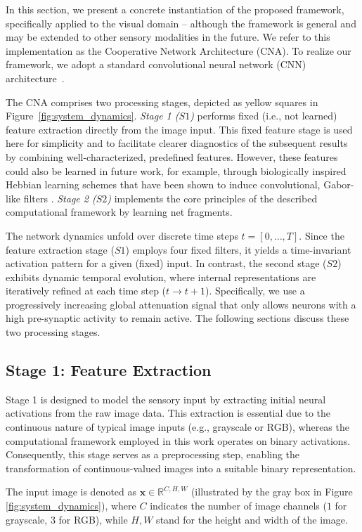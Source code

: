 \documentclass[12pt]{article}
\begin{document}
In this section, we present a concrete instantiation of the proposed framework, specifically applied to the visual domain -- although the framework is general and may be extended to other sensory modalities in the future. We refer to this implementation as the Cooperative Network Architecture (CNA).
To realize our framework, we adopt a standard convolutional neural network (CNN) architecture~\citep{lecun_backpropagation_1989}.

The CNA comprises two processing stages, depicted as yellow squares in Figure~\ref{fig:system_dynamics}. \emph{Stage 1 ($S1$)} performs fixed (i.e., not learned) feature extraction directly from the image input. This fixed feature stage is used here for simplicity and to facilitate clearer diagnostics of the subsequent results by combining well-characterized, predefined features. However, these features could also be learned in future work, for example, through biologically inspired Hebbian learning schemes that have been shown to induce convolutional, Gabor-like filters \citep[e.g.,][]{miconi_hebbian_2021}. \emph{Stage 2 ($S2$)} implements the core principles of the described computational framework by learning net fragments.

The network dynamics unfold over discrete time steps $t = [0, \dots, T]$.
Since the feature extraction stage ($S1$) employs four fixed filters, it yields a time-invariant activation pattern for a given (fixed) input.
In contrast, the second stage ($S2$) exhibits dynamic temporal evolution, where internal representations are iteratively refined at each time step ($t \to t+1$).
Specifically, we use a progressively increasing global attenuation signal that only allows neurons with a high pre-synaptic activity to remain active.
The following sections discuss these two processing stages.

\subsection{Stage 1: Feature Extraction}
Stage 1 is designed to model the sensory input by extracting initial neural activations from the raw image data. This extraction is essential due to the continuous nature of typical image inputs (e.g., grayscale or RGB), whereas the computational framework employed in this work operates on binary activations. Consequently, this stage serves as a preprocessing step, enabling the transformation of continuous-valued images into a suitable binary representation.

The input image is denoted as $\boldsymbol{x} \in \mathbb{R}^{C, H, W}$ (illustrated by the gray box in Figure \ref{fig:system_dynamics}), where $C$ indicates the number of image channels ($1$ for grayscale, $3$ for RGB), while $H,  W$ stand for the height and width of the image.
\end{document}
